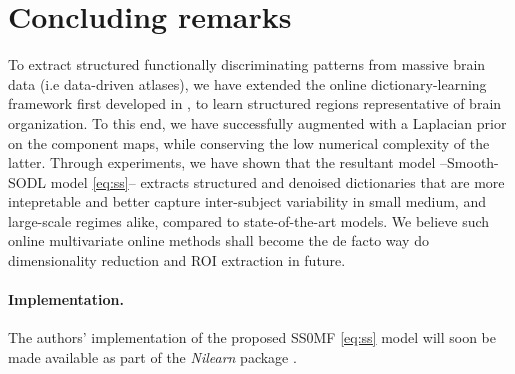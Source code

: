 \section{Concluding remarks}
To extract structured functionally discriminating patterns
from massive brain data (i.e data-driven atlases), we have extended
the online dictionary-learning framework first developed in
  \citep{mairal2010}, to learn structured regions
representative of brain organization. To this end, we have successfully augmented   \citep{mairal2010} with a Laplacian prior on the component maps,
while conserving the low numerical complexity of the latter.
Through experiments, we have shown that the resultant model --Smooth-SODL model \eqref{eq:ss}-- extracts structured and denoised dictionaries that are more intepretable and better capture inter-subject variability in small medium, and large-scale regimes alike, compared to state-of-the-art models.
We believe such online multivariate online methods shall become the de facto
way do dimensionality reduction and ROI extraction in future.

\paragraph{Implementation.} The authors' implementation of the proposed
SS0MF \eqref{eq:ss} model will soon be made available as part of the
\textit{Nilearn} package   \citep{nilearn}.







